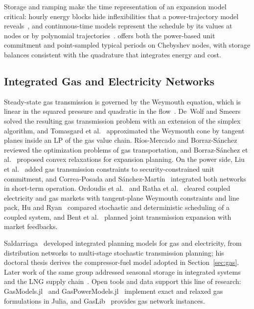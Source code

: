 Storage and ramping make the time representation of an expansion model
critical: hourly energy blocks hide inflexibilities that a
power-trajectory model reveals~\cite{moralesespana2017hidden,
moralesespana2015powerbased}, and continuous-time models represent the
schedule by its values at nodes or by polynomial
trajectories~\cite{matus2015chebyshev, parvania2016continuous}.
\gtopt{} offers both the power-based unit commitment and point-sampled
typical periods on Chebyshev nodes, with storage balances consistent
with the quadrature that integrates energy and cost.

\subsection{Integrated Gas and Electricity Networks}
\label{sec:lit_gas}

Steady-state gas transmission is governed by the Weymouth equation,
which is linear in the squared pressure and quadratic in the
flow~\cite{menon2005gas}.  De~Wolf and Smeers~\cite{dewolf2000gas}
solved the resulting gas transmission problem with an extension of the
simplex algorithm, and Tomasgard et al.~\cite{tomasgard2007gas}
approximated the Weymouth cone by tangent planes inside an LP of the
gas value chain.  R\'ios-Mercado and
Borraz-S\'anchez~\cite{riosmercado2015review} reviewed the optimization
problems of gas transportation, and Borraz-S\'anchez et
al.~\cite{borraz2016relaxations} proposed convex relaxations for
expansion planning.  On the power side, Liu et al.~\cite{liu2009scuc_gas}
added gas transmission constraints to security-constrained unit
commitment, and Correa-Posada and
S\'anchez-Mart\'in~\cite{correaposada2015gas} integrated both networks
in short-term operation.  Ordoudis et al.~\cite{ordoudis2019gas} and
Ratha et al.~\cite{ratha2020affine} cleared coupled electricity and gas
markets with tangent-plane Weymouth constraints and line pack, Hu and
Ryan~\cite{hu2019stochastic} compared stochastic and deterministic
scheduling of a coupled system, and Bent et al.~\cite{bent2018joint}
planned joint transmission expansion with market feedbacks.

Saldarriaga~\cite{saldarriaga2013msc, saldarriaga2013holistic,
saldarriaga2018phd, saldarriaga2019stochastic} developed integrated
planning models for gas and electricity, from distribution networks to
multi-stage stochastic transmission planning; his doctoral thesis
derives the compressor-fuel model adopted in Section~\ref{sec:gas}.
Later work of the same group addressed seasonal storage in integrated
systems~\cite{martinez2022storage} and the LNG supply
chain~\cite{ibarra2019gnl, restrepo2021gnl}.  Open tools and data
support this line of research: GasModels.jl~\cite{gasmodels} and
GasPowerModels.jl~\cite{gaspowermodels} implement exact and relaxed gas
formulations in Julia, and GasLib~\cite{schmidt2017gaslib,
pfetsch2015nominations} provides gas network instances.

